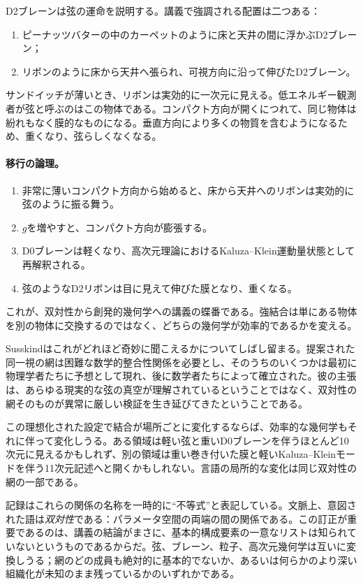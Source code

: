 D2ブレーンは弦の運命を説明する。講義で強調される配置は二つある：
\begin{enumerate}
\item ピーナッツバターの中のカーペットのように床と天井の間に浮かぶD2ブレーン；
\item リボンのように床から天井へ張られ、可視方向に沿って伸びたD2ブレーン。
\end{enumerate}
サンドイッチが薄いとき、リボンは実効的に一次元に見える。低エネルギー観測者が弦と呼ぶのはこの物体である。コンパクト方向が開くにつれて、同じ物体は紛れもなく膜的なものになる。垂直方向により多くの物質を含むようになるため、重くなり、弦らしくなくなる。

\paragraph{移行の論理。}
\begin{enumerate}
\item 非常に薄いコンパクト方向から始めると、床から天井へのリボンは実効的に弦のように振る舞う。
\item \(g\)を増やすと、コンパクト方向が膨張する。
\item D0ブレーンは軽くなり、高次元理論におけるKaluza--Klein運動量状態として再解釈される。
\item 弦のようなD2リボンは目に見えて伸びた膜となり、重くなる。
\end{enumerate}
これが、双対性から創発的幾何学への講義の蝶番である。強結合は単にある物体を別の物体に交換するのではなく、どちらの幾何学が効率的であるかを変える。

Susskindはこれがどれほど奇妙に聞こえるかについてしばし留まる。提案された同一視の網は困難な数学的整合性関係を必要とし、そのうちのいくつかは最初に物理学者たちに予想として現れ、後に数学者たちによって確立された。彼の主張は、あらゆる現実的な弦の真空が理解されているということではなく、双対性の網そのものが異常に厳しい検証を生き延びてきたということである。

この理想化された設定で結合が場所ごとに変化するならば、効率的な幾何学もそれに伴って変化しうる。ある領域は軽い弦と重いD0ブレーンを伴うほとんど10次元に見えるかもしれず、別の領域は重い巻き付いた膜と軽いKaluza--Kleinモードを伴う11次元記述へと開くかもしれない。言語の局所的な変化は同じ双対性の網の一部である。

記録はこれらの関係の名称を一時的に``不等式''と表記している。文脈上、意図された語は\emph{双対性}である：パラメータ空間の両端の間の関係である。この訂正が重要であるのは、講義の結論がまさに、基本的構成要素の一意なリストは知られていないというものであるからだ。弦、ブレーン、粒子、高次元幾何学は互いに変換しうる；網のどの成員も絶対的に基本的でないか、あるいは何らかのより深い組織化が未知のまま残っているかのいずれかである。

